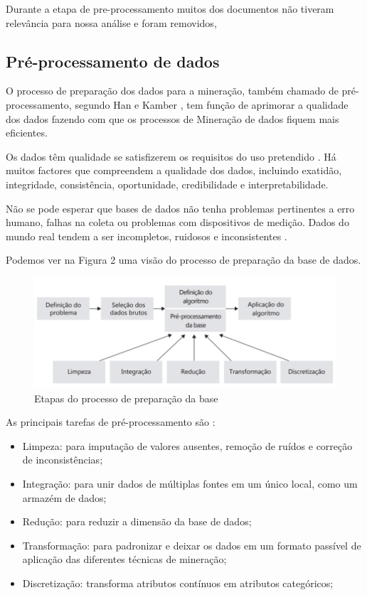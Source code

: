 \documentclass[conference]{IEEEtran}
\begin{document}
Durante a etapa de pre-processamento muitos dos documentos não tiveram relevância para nossa análise e foram removidos,

	\subsection{Pré-processamento de dados}
  O processo de preparação dos dados para a mineração, também chamado de pré-processamento, segundo Han e Kamber \cite{mineracao_conceitos_tecnicas}, tem função de aprimorar a qualidade dos dados fazendo com que os processos de Mineração de dados fiquem mais eficientes.
 
    Os dados têm qualidade se satisfizerem os requisitos do uso pretendido . Há muitos factores que compreendem a qualidade dos dados, incluindo exatidão, integridade, consistência, oportunidade, credibilidade e interpretabilidade\cite{mineracao_conceitos_tecnicas}.
      
     Não se pode esperar que bases de dados não tenha problemas pertinentes a erro humano, falhas na coleta ou problemas com dispositivos de medição. Dados do mundo real tendem a ser incompletos, ruidosos e inconsistentes \cite{mineracao_conceitos_tecnicas}. 

    Podemos ver na  Figura 2 uma visão do processo de preparação da base de dados.

\begin{figure}[htbp]
	\centerline{\includegraphics[scale=0.3]{imagens/preprocessamento.png}}
	\caption{Etapas do processo de preparação da base}
	
	\label{fig}
	\end{figure}

As principais tarefas de pré-processamento são  \cite{mineracao_nunes}:
\begin{itemize}
\item Limpeza: para imputação de valores ausentes, remoção de ruídos e correção de inconsistências;
\item Integração: para unir dados de múltiplas fontes em um único local, como um armazém de dados;
\item Redução: para reduzir a dimensão da base de dados;
\item Transformação: para padronizar e deixar os dados em um formato passível de aplicação das diferentes técnicas de mineração;
\item Discretização: transforma atributos contínuos em atributos categóricos;
\end{itemize}
\end{document}

